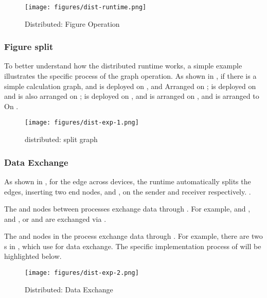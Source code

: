 \begin{content}
\begin{figure}[H]
\centering
\texttt{[image: figures/dist-runtime.png]}
\caption{Distributed: Figure Operation}
 \label{fig:dist-runtime}
\end{figure}

\subsubsection{Figure split}

To better understand how the distributed runtime works, a simple example illustrates the specific process of the graph operation. As shown in , if there is a simple calculation graph, and  is deployed on , and Arranged on ;  is deployed on  and is also arranged on ;  is deployed on , and  is arranged on , and  is arranged to On .

\begin{figure}[H]
\centering
\texttt{[image: figures/dist-exp-1.png]}
\caption{distributed: split graph}
 \label{fig:dist-exp-1}
\end{figure}

\subsubsection{Data Exchange}

As shown in , for the edge across devices, the runtime automatically splits the edges, inserting two end nodes,  and , on the sender and receiver respectively. .

The  and  nodes between processes exchange data through . For example,  and , and , or  and  are exchanged via .

The  and  nodes in the process exchange data through . For example, there are two s in , which use  for data exchange. The specific implementation process of  will be highlighted below.

\begin{figure}[H]
\centering
\texttt{[image: figures/dist-exp-2.png]}
\caption{Distributed: Data Exchange}
 \label{fig:dist-exp-2}
\end{figure}


\end{content}
